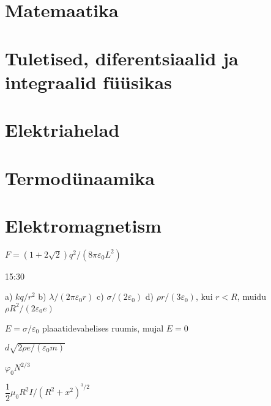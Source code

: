 \documentclass[a4paper,11pt,twocolumn]{article}
\begin{document}
\section{Matemaatika}
\section{Tuletised, diferentsiaalid ja integraalid füüsikas}
\section{Elektriahelad}
\section{Termodünaamika}
\section{Elektromagnetism}
\begin{solutions}
	\item \( F = (1 + 2\sqrt2)q^2/(8\pi\varepsilon_0 L^2) \)
	\item 15:30
	\item a) \( kq/r^2 \) b) \( \lambda/(2\pi\varepsilon_0 r) \) c) \( \sigma/(2\varepsilon_0) \) d) \( \rho r/(3\varepsilon_0) \), kui \( r<R \), muidu \( \rho R^2/(2\varepsilon_0 e) \)
	\item \( E=\sigma/\varepsilon_0 \) plaaatidevahelises ruumis, mujal \( E=0 \)
	\item \( d\sqrt{2\rho e/(\varepsilon_0 m)} \)
	\item \( \varphi_0 N^{2/3} \) 
	\item 
	\item 
	\item
	\item \( \dfrac{1}{2}\mu_0 R^2 I/(R^2+x^2)^{^3/2} \)
\end{solutions}
\end{document}
